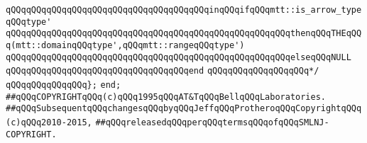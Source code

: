 \verb|qQQqqQQqqQQqqQQqqQQqqQQqqQQqqQQqqQQqqQQqinqQQqifqQQqmtt::is_arrow_typeqQQqtype'|\newline
\verb|qQQqqQQqqQQqqQQqqQQqqQQqqQQqqQQqqQQqqQQqqQQqqQQqqQQqqQQqthenqQQqTHEqQQq(mtt::domainqQQqtype',qQQqmtt::rangeqQQqtype')|\newline
\verb|qQQqqQQqqQQqqQQqqQQqqQQqqQQqqQQqqQQqqQQqqQQqqQQqqQQqqQQqelseqQQqNULL|\newline
\verb|qQQqqQQqqQQqqQQqqQQqqQQqqQQqqQQqqQQqend|\newline
\verb|qQQqqQQqqQQqqQQqqQQq*/|\newline
\verb|qQQqqQQqqQQqqQQq};|\newline
\verb|end;|\newline
\newline
\newline
\newline
\verb|##qQQqCOPYRIGHTqQQq(c)qQQq1995qQQqAT&TqQQqBellqQQqLaboratories.|\newline
\verb|##qQQqSubsequentqQQqchangesqQQqbyqQQqJeffqQQqProtheroqQQqCopyrightqQQq(c)qQQq2010-2015,|\newline
\verb|##qQQqreleasedqQQqperqQQqtermsqQQqofqQQqSMLNJ-COPYRIGHT.|\newline

